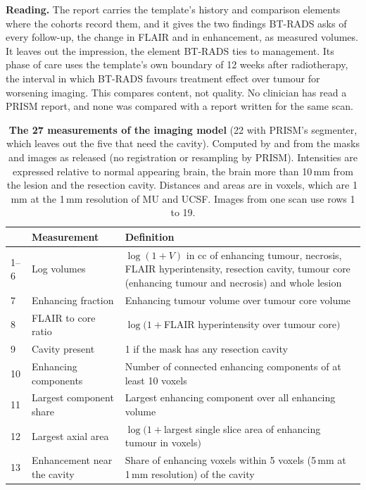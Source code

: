 \documentclass[11pt,a4paper]{article}
\begin{document}
\textbf{Reading.} The report carries the template's history and comparison elements where the cohorts record them,
and it gives the two findings BT-RADS asks of every follow-up, the change in FLAIR and in enhancement, as measured
volumes. It leaves out the impression, the element BT-RADS ties to management. Its phase of care uses the
template's own boundary of 12 weeks after radiotherapy, the interval in which BT-RADS favours treatment effect over
tumour for worsening imaging. This compares content, not quality. No clinician has read a PRISM report,
and none was compared with a report written for the same scan.


\begin{table}[H]
\centering
\small
\renewcommand{\thetable}{S7}\renewcommand{\theHtable}{S7}
\caption{\textbf{The 27 measurements of the imaging model} (22 with PRISM's segmenter, which leaves out the five that need the cavity). Computed by  and
 from the masks and images as released (no registration or resampling by PRISM). Intensities are expressed relative to normal appearing brain, the brain more
than 10\,mm from the lesion and the resection cavity. Distances and areas are in voxels, which are 1\,mm at the 1\,mm
resolution of MU and UCSF.
Images from one scan use rows 1 to 19.}
\label{tab:S47}
\zebrarows
\begin{tabularx}{\linewidth}{@{}R{0.6cm}R{4.6cm}L@{}}
\toprule
 & Measurement & Definition \\
--6 & Log volumes & $\log(1+V)$ in cc of enhancing tumour, necrosis, FLAIR hyperintensity, resection cavity, tumour core (enhancing tumour and necrosis) and whole lesion \\
7 & Enhancing fraction & Enhancing tumour volume over tumour core volume \\
8 & FLAIR to core ratio & $\log(1+{}$FLAIR hyperintensity over tumour core$)$ \\
9 & Cavity present & 1 if the mask has any resection cavity \\
10 & Enhancing components & Number of connected enhancing components of at least 10 voxels \\
11 & Largest component share & Largest enhancing component over all enhancing volume \\
12 & Largest axial area & $\log(1+{}$largest single slice area of enhancing tumour in voxels$)$ \\
13 & Enhancement near the cavity & Share of enhancing voxels within 5 voxels (5\,mm at 1\,mm resolution) of the cavity \\

\end{tabularx}
\end{table}
\end{document}
